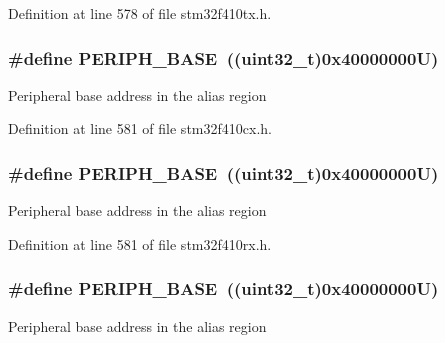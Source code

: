 Definition at line 578 of file stm32f410tx.\+h.

\subsubsection[{\texorpdfstring{P\+E\+R\+I\+P\+H\+\_\+\+B\+A\+SE}{PERIPH_BASE}}]{\setlength{\rightskip}{0pt plus 5cm}\#define P\+E\+R\+I\+P\+H\+\_\+\+B\+A\+SE~((uint32\+\_\+t)0x40000000\+U)}\hypertarget{group___peripheral__registers__structures_ga9171f49478fa86d932f89e78e73b88b0}{}\label{group___peripheral__registers__structures_ga9171f49478fa86d932f89e78e73b88b0}
Peripheral base address in the alias region 

Definition at line 581 of file stm32f410cx.\+h.

\subsubsection[{\texorpdfstring{P\+E\+R\+I\+P\+H\+\_\+\+B\+A\+SE}{PERIPH_BASE}}]{\setlength{\rightskip}{0pt plus 5cm}\#define P\+E\+R\+I\+P\+H\+\_\+\+B\+A\+SE~((uint32\+\_\+t)0x40000000\+U)}\hypertarget{group___peripheral__registers__structures_ga9171f49478fa86d932f89e78e73b88b0}{}\label{group___peripheral__registers__structures_ga9171f49478fa86d932f89e78e73b88b0}
Peripheral base address in the alias region 

Definition at line 581 of file stm32f410rx.\+h.

\subsubsection[{\texorpdfstring{P\+E\+R\+I\+P\+H\+\_\+\+B\+A\+SE}{PERIPH_BASE}}]{\setlength{\rightskip}{0pt plus 5cm}\#define P\+E\+R\+I\+P\+H\+\_\+\+B\+A\+SE~((uint32\+\_\+t)0x40000000\+U)}\hypertarget{group___peripheral__registers__structures_ga9171f49478fa86d932f89e78e73b88b0}{}\label{group___peripheral__registers__structures_ga9171f49478fa86d932f89e78e73b88b0}
Peripheral base address in the alias region 

